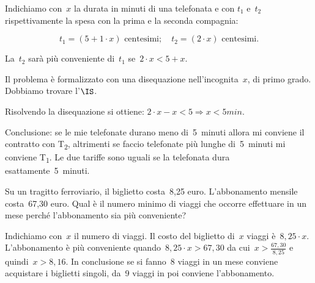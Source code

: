 \begin{soluzione}
 Indichiamo con~$x$ la durata in minuti di una telefonata e con
$t_{1}$ e~$t_{2}$ rispettivamente la spesa con
la prima e la seconda compagnia:

\[t_{1}=(5+1\cdot x)\text{ centesimi};\quad t_{2}=(2\cdot x)\text{ centesimi.}\]

La~$t_2$ sarà più conveniente di~$t_1$ se~$2\cdot x<5+x$.

Il problema è formalizzato con una disequazione
nell'incognita~$x$, di primo grado. Dobbiamo trovare l'$\IS$.

Risolvendo la disequazione si ottiene:
$2\cdot x-x<5\Rightarrow x<5\unit{min}$.

Conclusione: se le mie telefonate durano meno di~5~minuti allora mi
conviene il contratto con T\textsubscript{2}, altrimenti se faccio
telefonate più lunghe di~5~minuti mi conviene T\textsubscript{1}. Le
due tariffe sono uguali se la telefonata dura esattamente~5~minuti.
 \end{soluzione}

 \begin{problema}[L'abbonamento]
 Su un tragitto ferroviario, il biglietto costa~8,25 euro.
L'abbonamento mensile costa~67,30 euro. Qual è il
numero minimo di viaggi che occorre effettuare in un mese perché
l'abbonamento sia più conveniente?
 \end{problema}

 \begin{soluzione}
 Indichiamo con~$x$ il numero di viaggi. Il costo del biglietto di~$x$ viaggi
è~$8,25\cdot x$. L'abbonamento è più
conveniente quando~$8,25\cdot x>67,30$ da cui~$x>\frac{67,30}{8,25}$
e quindi~$x>8,16$. In conclusione se si fanno~8 viaggi in un
mese conviene acquistare i biglietti singoli, da~9 viaggi in poi
conviene l'abbonamento.
 \end{soluzione}




